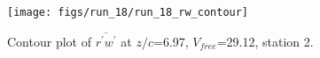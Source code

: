 \begin{figure}[H]
\centering
\texttt{[image: figs/run\_18/run\_18\_rw\_contour]}
\caption{Contour plot of $\overline{r^\prime w^\prime}$ at $z/c$=6.97, $V_{free}$=29.12, station 2.}
\label{fig:run_18_rw_contour}
\end{figure}


